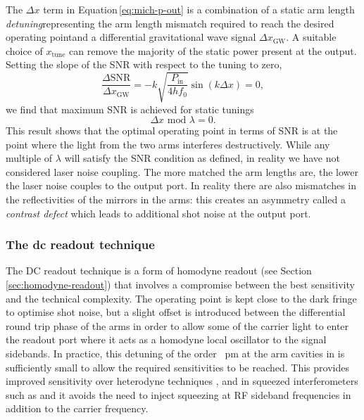 The $\Delta x$ term in Equation\,\ref{eq:mich-p-out} is a combination of a static arm length \emph{detuning}\textemdash representing the arm length mismatch required to reach the desired operating point\textemdash and a differential gravitational wave signal $\Delta x_{\text{GW}}$. A suitable choice of $ x_{\text{tune}}$ can remove the majority of the static power present at the output. Setting the slope of the \gls{SNR} with respect to the tuning to zero,
\begin{equation}
  \frac{\Delta \text{SNR}}{\Delta x_{\text{GW}}} = -k \sqrt{\frac{P_{\text{in}}}{4 h f_0}} \sin \left(k \Delta x\right) = 0,
\end{equation}
we find that maximum \gls{SNR} is achieved for static tunings 
\begin{equation}
  \Delta x \text{ mod } \lambda = 0.
\end{equation}
This result shows that the optimal operating point in terms of \gls{SNR} is at the point where the light from the two arms interferes destructively. While any multiple of $\lambda$ will satisfy the \gls{SNR} condition as defined, in reality we have not considered laser noise coupling. The more matched the arm lengths are, the lower the laser noise couples to the output port. In reality there are also mismatches in the reflectivities of the mirrors in the arms: this creates an asymmetry called a \emph{contrast defect} which leads to additional shot noise at the output port.

\subsubsection{The dc readout technique}
The \gls{DC} readout technique is a form of homodyne readout (see Section\,\ref{sec:homodyne-readout}) that involves a compromise between the best sensitivity and the technical complexity. The operating point is kept close to the dark fringe to optimise shot noise, but a slight offset is introduced between the differential round trip phase of the arms in order to allow some of the carrier light to enter the readout port where it acts as a homodyne local oscillator to the signal sidebands. In practice, this detuning \textemdash of the order \SI{}{\pico\meter} at the arm cavities in \ALIGO{}\textemdash is sufficiently small to allow the required sensitivities to be reached. This provides improved sensitivity over heterodyne techniques \cite{Fricke2012}, and in squeezed interferometers such as \ETLF{} and \ETHF{} it avoids the need to inject squeezing at \gls{RF} sideband frequencies in addition to the carrier frequency.

